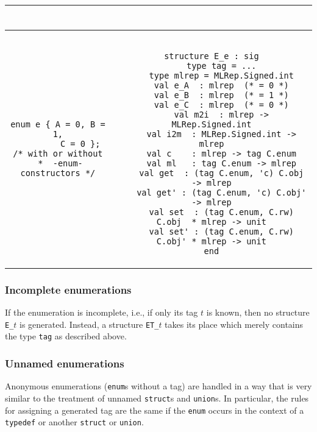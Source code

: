 \documentclass[titlepage,letterpaper]{article}
\begin{document}
\begin{small}
\begin{center}
\begin{tabular}{c|c}
\begin{minipage}{4in}
\begin{verbatim}
\end{verbatim}
\end{minipage}
\\ \hline
\begin{minipage}{2in}
\begin{verbatim}
enum e { A = 0, B = 1,
         C = 0 };
/* with or without
 *  -enum-constructors */
\end{verbatim}
\end{minipage}
&
\begin{minipage}{4in}
\begin{verbatim}

structure E_e : sig
    type tag = ...
    type mlrep = MLRep.Signed.int
    val e_A  : mlrep  (* = 0 *)
    val e_B  : mlrep  (* = 1 *)
    val e_C  : mlrep  (* = 0 *)
    val m2i  : mlrep -> MLRep.Signed.int
    val i2m  : MLRep.Signed.int -> mlrep
    val c    : mlrep -> tag C.enum
    val ml   : tag C.enum -> mlrep
    val get  : (tag C.enum, 'c) C.obj  -> mlrep
    val get' : (tag C.enum, 'c) C.obj' -> mlrep
    val set  : (tag C.enum, C.rw) C.obj  * mlrep -> unit
    val set' : (tag C.enum, C.rw) C.obj' * mlrep -> unit
end

\end{verbatim}
\end{minipage}
\end{tabular}
\end{center}
\end{small}


\subsubsection*{Incomplete enumerations}

If the enumeration is incomplete, i.e., if only its tag $t$ is known,
then no structure {\tt E\_$t$} is generated.  Instead, a structure
{\tt ET\_$t$} takes its place which merely contains the type {\tt tag}
as described above.

\subsubsection*{Unnamed enumerations}

Anonymous enumerations ({\tt enum}s without a tag) are handled in a
way that is very similar to the treatment of unnamed {\tt struct}s and
{\tt union}s.  In particular, the rules for assigning a generated tag
are the same if the {\tt enum} occurs in the context of a {\tt
  typedef} or another {\tt struct} or {\tt union}.
\end{document}
